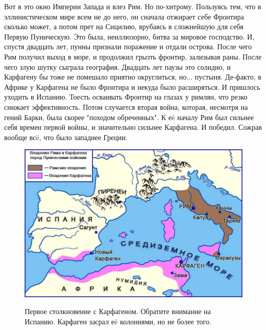 Вот в это окно Империи Запада и влез Рим. Но по-хитрому. Пользуясь тем, что в эллинистическом мире всем не до него, он сначала отжирает себе Фронтира сколько может, а потом прет на Сицилию, врубаясь в сложнейшую для себя Первую Пуническую. Это была, неиллюзорно, битва за мировое господство. И, спустя двадцать лет, пунны признали поражение и отдали острова. После чего Рим получил выход в море, и продолжил грызть фронтир, зализывая раны. После чего злую шутку сыграла география. Двадцать лет паузы это солидно, и Карфагену бы тоже не помешало приятно округлиться, но... пустыня. Де-факто, в Африке у Карфагена не было Фронтира и некуда было расширяться. И пришлось уходить в Испанию. Тоесть осваивать Фронтир на глазах у римлян, что резко снижает эффективность. Потом случается вторая война, которая, несмотря на гений Барки, была скорее "походом обреченных". К еë началу Рим был сильнее себя времен первой войны, и значительно сильнее Карфагена. И победил. Сожрав вообще всë, что было западнее Греции. 


\begin{figure}[h!tb]
	\centering\includegraphics[scale=0.4]{regional_hehemons/1613656370149685122.png}
	\label{fig:heh6} %
	\caption{Первое столкновение с Карфагеном. Обратите внимание на Испанию. Карфаген засрал еë колониями, но не более того. }
\end{figure}

